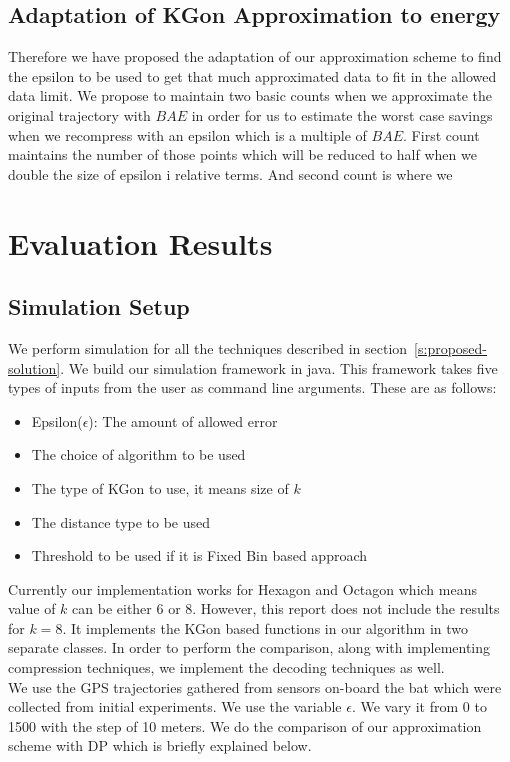 \documentclass[conference]{IEEEtran}
\begin{document}
\subsection{Adaptation of KGon Approximation to energy}
 
Therefore we have proposed the adaptation of our approximation scheme to find the epsilon to be used to get that much approximated data to fit in the allowed data limit. We propose to maintain two basic counts when we approximate the original trajectory with $BAE$ in order for us to estimate the worst case savings when we recompress with an epsilon which is a multiple of $BAE$. First count maintains the number of those points which will be reduced to half when we double the size of epsilon i relative terms. And second count is where we 
 
 \section{Evaluation Results}
 \subsection{Simulation Setup}\label{sec:simulation}
 We perform simulation for all the techniques described in section~\ref{s:proposed-solution}. We build our simulation framework in java. This framework takes five types of inputs from the user as command line arguments. These are as follows:
 \begin{itemize}
 \item Epsilon($\epsilon$): The amount of allowed error
 \item The choice of algorithm to be used
 \item The type of KGon to use, it means size of $k$
 \item The distance type to be used
 \item Threshold to be used if it is Fixed Bin based approach
 \end{itemize}
 Currently our implementation works for Hexagon and Octagon which means value of $k$ can be either 6 or 8. However, this report does not include the results for $k = 8$. It implements the KGon based functions in our algorithm in two separate classes. In order to perform the comparison, along with implementing compression techniques, we implement the decoding techniques as well. \\
 We use the GPS trajectories gathered from sensors on-board the bat which were collected from initial experiments. We use the variable $\epsilon$. We vary it from 0 to 1500 with the step of 10 meters.
 We do the comparison of our approximation scheme with DP which is briefly explained below.
\end{document}
